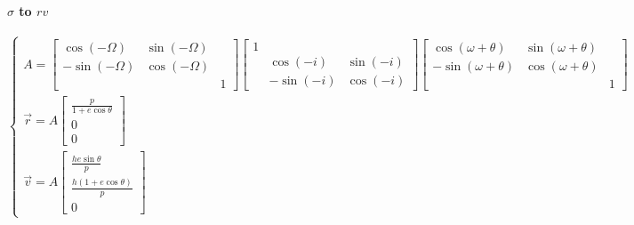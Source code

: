 \documentclass[UTF8]{ctexart}
\begin{document}
\paragraph{$\sigma$ to $rv$}
\begin{equation}
	\begin{cases}
			A=\begin{bmatrix}
			\cos(-\Omega) & \sin(-\Omega) & \\
			-\sin(-\Omega) & \cos(-\Omega) & \\
			& & 1
		\end{bmatrix}\begin{bmatrix}
			1 & &\\
			& \cos(-i) & \sin(-i)\\
			& -\sin(-i) & \cos(-i)
		\end{bmatrix}\begin{bmatrix}
			\cos(\omega+\theta) & \sin(\omega+\theta) & \\
			-\sin(\omega+\theta) & \cos(\omega+\theta) &\\
			& & 1
		\end{bmatrix}\\
		\vec{r}=A\begin{bmatrix}
			\frac{p}{1+e\cos\theta}\\
			0\\
			0
		\end{bmatrix}\\
		\vec{v}=A\begin{bmatrix}
		\frac{he\sin\theta}{p}\\
		\frac{h(1+e\cos\theta)}{p}\\
		0
		\end{bmatrix}
	\end{cases}
\end{equation}

\end{document}
